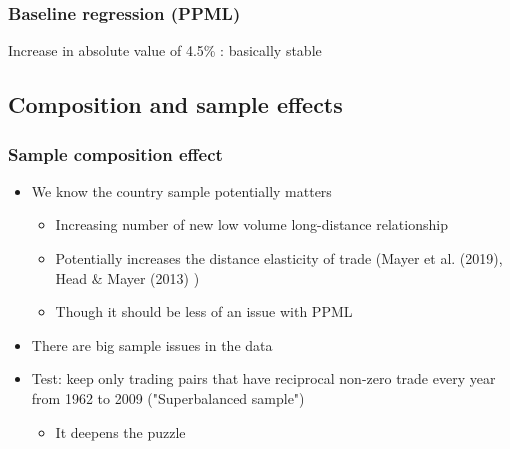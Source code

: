 \documentclass{beamer}
\begin{document}
\begin{frame}[plain]\frametitle{Baseline regression (PPML)}
\begin{figure}[h!]
\begin{center}
\setlength{\fboxrule}{1pt} %
\setlength{\fboxsep}{.1in} %
\end{center}
\end{figure}
Increase in absolute value of 4.5\% : basically stable
\end{frame}

\subsection{Composition and sample effects}
\begin{frame}\frametitle{Sample composition effect}
\begin{itemize}
\item We know the country sample potentially matters
	\begin{itemize}
	\item Increasing number of new low volume long-distance relationship
	\item Potentially increases the distance elasticity of trade (Mayer et al. (2019), Head \& Mayer (2013) ) 
	\item Though it should be less of an issue with PPML
	\end{itemize}
\item There are big sample issues in the data	
\item Test: keep only trading pairs that have reciprocal non-zero trade every year from 1962 to 2009 ("Superbalanced sample")
	\begin{itemize}
	\item It deepens the puzzle 
	\end{itemize}
\end{itemize}
\end{frame}
\end{document}
